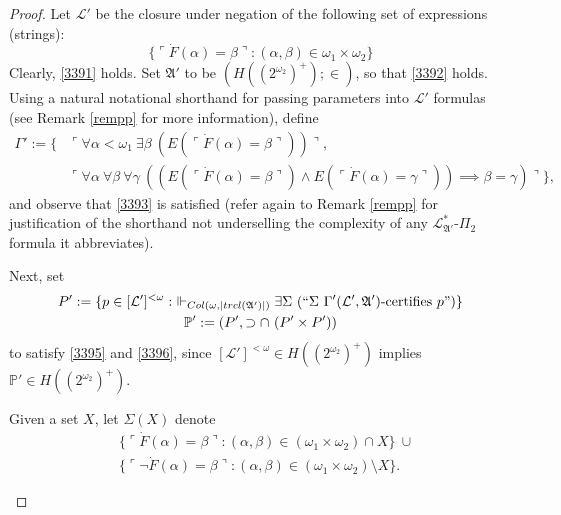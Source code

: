 \documentclass[12pt]{article}
\numberwithin{equation}{section}
\begin{document}
\begin{proof}
Let $\mathcal{L}'$ be the closure under negation of the following set of expressions (strings):
\begin{equation*}
    \{\ulcorner \dot{F} (\alpha) = \beta \urcorner : (\alpha, \beta) \in \omega_1 \times \omega_2\}
\end{equation*}
Clearly, \ref{3391} holds. Set $\mathfrak{A}'$ to be $(H((2^{\omega_2})^+); \in)$, so that \ref{3392} holds. Using a natural notational shorthand for passing parameters into $\mathcal{L}'$ formulas (see Remark \ref{rempp} for more information), define 
\begin{align*}
    \Gamma' := \{ & \ulcorner \forall \alpha < \omega_1 \ \exists \beta \ (E(\ulcorner \dot{F}(\alpha) = \beta \urcorner)) \urcorner, \\ 
    & \ulcorner \forall \alpha \ \forall \beta \ \forall \gamma \ ((E(\ulcorner \dot{F}(\alpha) = \beta \urcorner) \wedge E(\ulcorner \dot{F}(\alpha) = \gamma \urcorner)) \implies \beta = \gamma) \urcorner\} \text{,}
\end{align*}
and observe that \ref{3393} is satisfied (refer again to Remark \ref{rempp} for justification of the shorthand not underselling the complexity of any $\mathcal{L}^{*}_{\mathfrak{A}'}$-$\Pi_2$ formula it abbreviates). 

Next, set 
\begin{gather*}
    P' := \{p \in [\mathcal{L}']^{< \omega} : \ \Vdash_{Col(\omega, |trcl(\mathfrak{A}')|)} \exists \Sigma \ (``\Sigma \ \Gamma'(\mathcal{L}', \mathfrak{A}') \text{-certifies } p")\} \\
    \mathbb{P}' := (P', \supset \cap \ (P' \times P'))
\end{gather*}
to satisfy \ref{3395} and \ref{3396}, since $[\mathcal{L}']^{< \omega} \in H((2^{\omega_2})^+)$ implies $\mathbb{P}' \in H((2^{\omega_2})^+)$.

\begin{defi}
Given a set $X$, let $\Sigma(X)$ denote
\begin{align*}
    & \{\ulcorner \dot{F} (\alpha) = \beta \urcorner : (\alpha, \beta) \in (\omega_1 \times \omega_2) \cap X\} \ \cup \\
    & \{\ulcorner \neg \dot{F} (\alpha) = \beta \urcorner : (\alpha, \beta) \in (\omega_1 \times \omega_2) \setminus X\} \text{.}
\end{align*}
\end{defi}


\end{proof}
\end{document}
